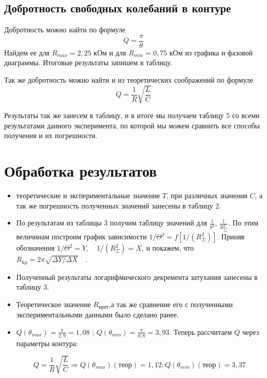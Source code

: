 \documentclass[a4paper, 12pt]{article}%
\begin{document}
\subsection{Добротность свободных колебаний в контуре}
Добротность можно найти по формуле 
\[Q = \dfrac{\pi}{\theta}\]
Найдем ее для $R_{max} = 2,25$ кОм и для $R_{min} = 0,75$ кОм из графика и фазовой диаграммы. Итоговые результаты запишем в таблицу.

Так же добротность можно найти и из теоретических соображений по формуле
\[Q = \dfrac{1}{R}\sqrt{\dfrac{L}{C}}\]

Результаты так же занесем в таблицу, и в итоге мы получаем таблицу 5 со всеми результатами данного эксперимента, по которой мы можем сравнить все способы получения и их погрешности.

\section{Обработка результатов}

\begin{itemize}

\item теоретические и экспериментальные значение $T$, при различных значения $C$, а так же погрешность полученных значений занесены в таблицу 2.

\item По результатам из таблицы 3 получим таблицу значений для $\frac{1}{\theta^2}$, $\frac{1}{R_{\sum}^2}$. По этим величинам построим график зависимости $1 / \Theta^{2}=f\left[1 /\left(R_{\Sigma}^{2}\right)\right] .$ Приняв обозначения $1 / \Theta^{2}=Y, \quad 1 /\left(R_{\Sigma}^{2}\right)=X$, и покажем, что $R_{\mathrm{kp}}=2 \pi \sqrt{\Delta Y / \Delta X} \quad$.

\item Полученный результаты логарифмического декремента затухания занесены в таблицу 3.

\item Теоретическое значение $R_{\text{крит}}$,а так же сравнение его с полученными экспериментальными данными было сделано ранее. 

\item $Q(\theta_{max}) = \frac{\pi}{2,9} = 1,08$ ; $Q(\theta_{min}) = \frac{\pi}{0,8} = 3,93$. Теперь рассчитаем $Q$ через параметры контура: 

\[Q = \frac{1}{R} \sqrt{\frac{L}{C}} \Rightarrow  Q(\theta_{max})(\text{теор}) = 1, 12; Q(\theta_{min})(\text{теор}) = 3,37\] 

\end{itemize}
\end{document}
